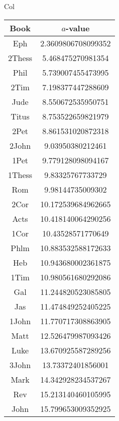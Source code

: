 \documentclass[12pt,letterpaper]{article}
\begin{document}
Col
\begin{longtable}{|c|c|}
\hline
 Book & $a$-value \\ \hline
Eph & 2.3609806708099352 \\ \hline
 2Thess & 5.468475270981354 \\ \hline
 Phil & 5.739007455473995 \\ \hline
 2Tim & 7.198377447288609 \\ \hline
 Jude & 8.550672535950751 \\ \hline
 Titus & 8.753522659821979 \\ \hline
 2Pet & 8.861531020872318 \\ \hline
 2John & 9.03950380212461 \\ \hline
 1Pet & 9.779128098094167 \\ \hline
 1Thess & 9.83325767733729 \\ \hline
 Rom & 9.98144735009302 \\ \hline
 2Cor & 10.172539684962665 \\ \hline
 Acts & 10.418140064290256 \\ \hline
 1Cor & 10.43528571770649 \\ \hline
 Phlm & 10.883532588172633 \\ \hline
 Heb & 10.943680002361875 \\ \hline
 1Tim & 10.980561680292086 \\ \hline
 Gal & 11.244820523085805 \\ \hline
 Jas & 11.474849252405225 \\ \hline
 1John & 11.770717308863905 \\ \hline
 Matt & 12.526479987093426 \\ \hline
 Luke & 13.670925587289256 \\ \hline
 3John & 13.73372401856001 \\ \hline
 Mark & 14.342928234537267 \\ \hline
 Rev & 15.213140460105995 \\ \hline
 John & 15.799653009352925 \\ \hline 
\end{longtable}
\end{document}

